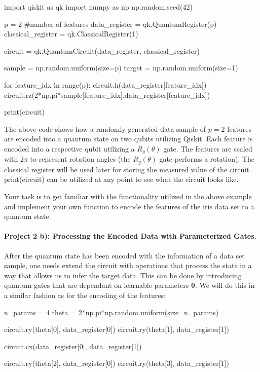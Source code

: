 \documentclass[%
oneside,                 %
final,                   %
10pt]{article}
\begin{document}
\bpycod
import qiskit as qk
import numpy as np
np.random.seed(42)

p = 2 #number of features
data_register = qk.QuantumRegister(p)
classical_register = qk.ClassicalRegister(1)

circuit = qk.QuantumCircuit(data_register, classical_register)

sample = np.random.uniform(size=p)
target = np.random.uniform(size=1)

for feature_idx in range(p):
    circuit.h(data_register[feature_idx])
    circuit.rz(2*np.pi*sample[feature_idx],data_register[feature_idx])

print(circuit)
\epycod

The above code shows how a randomly generated data sample of $p=2$
features are encoded into a quantum state on two qubits utilizing
Qiskit. Each feature is encoded into a respective qubit utilizing a
$R_y(\theta)$ gate. The features are scaled with $2\pi$ to represent
rotation angles (the $R_y(\theta)$ gate performs a rotation). The
classical register will be used later for storing the measured value
of the circuit.  print(circuit) can be utilized at any point to see
what the circuit looks like.



Your task is to get familiar with the functionality utilized in the
above example and implement your own function to encode the
features of the iris data set to a quantum state.


\paragraph{Project 2 b): Processing the Encoded Data with Parameterized Gates.}
After the quantum state has been encoded with the information of a data set sample, one needs extend the circuit with operations that process the state in a way that allows us to infer the target data. This can be done by introducing quantum gates that are dependant on learnable parameters $\boldsymbol{\theta}$. We will do this in a similar fashion as for the encoding of the features:

\bpycod
n_params = 4
theta = 2*np.pi*np.random.uniform(size=n_params)

circuit.ry(theta[0], data_register[0])
circuit.ry(theta[1], data_register[1])

circuit.cx(data_register[0], data_register[1])

circuit.ry(theta[2], data_register[0])
circuit.ry(theta[3], data_register[1])
\end{document}

